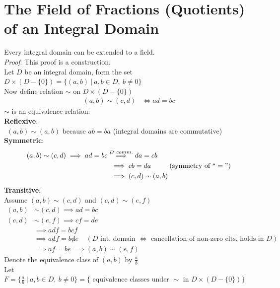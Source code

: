 \section{The Field of Fractions (Quotients) of an Integral Domain}
\begin{theorem}
    Every integral domain can be extended to a field. \\
    \textit{Proof}: This proof is a construction. \\
    Let $D$ be an integral domain, form the set
    $D\times (D-\{0\})=\{(a,b) \ | \ a,b\in D, \ b\neq 0\}$ \steezybreak \\
    Now define relation $\sim$ on $D\times (D-\{0\})$
    \begin{align}
        (a,b)\sim (c,d) &\iff ad=bc \nonumber
    \end{align}
    $\sim$ is an equivalence relation: \\
    \noindent \textbf{Reflexive}: \\
    \indent $\ \ (a,b)\sim (a,b)$ because $ab=ba$ (integral domains are commutative)\\
    \noindent \textbf{Symmetric}:
    \begin{align}
        (a,b)\sim (c,d) \implies ad=bc &\overset{D \  comm.}{\implies} da=cb \nonumber \\
        & \ \implies cb=da \ \ \ \ \ \ \ \ (\text{symmetry of }``=") \nonumber \\
        & \ \implies (c,d)\sim (a,b) \nonumber
    \end{align}
    \noindent \textbf{Transitive}: \\
    Assume $(a,b)\sim (c,d)$ and $(c,d)\sim (e,f)$
    \begin{align}
        (a,b)&\sim (c,d) \implies ad=bc \nonumber \\
        (c,d)&\sim (e,f) \implies cf=de \nonumber \\
        &\implies adf= bcf \nonumber \\
        &\implies a\not d f = b\not d e  \ \ \ \ \ (D \text{ int. domain }\iff \text{ cancellation of non-zero elts. holds in }D)\nonumber \\
        &\implies af=be \ \implies (a,b)\sim (e,f) \nonumber
    \end{align}
    \noindent Denote the equivalence class of $(a,b)$ by $\frac{a}{b}$ \steezybreak \\
    Let
    $F=\{\frac{a}{b} \ | \ a,b\in D, \  b\neq 0\} = \{\text{ equivalence classes under }\sim \text{ in }D\times (D-\{0\})\}$
    \begin{tcolorbox}

\end{tcolorbox}
\end{theorem}
